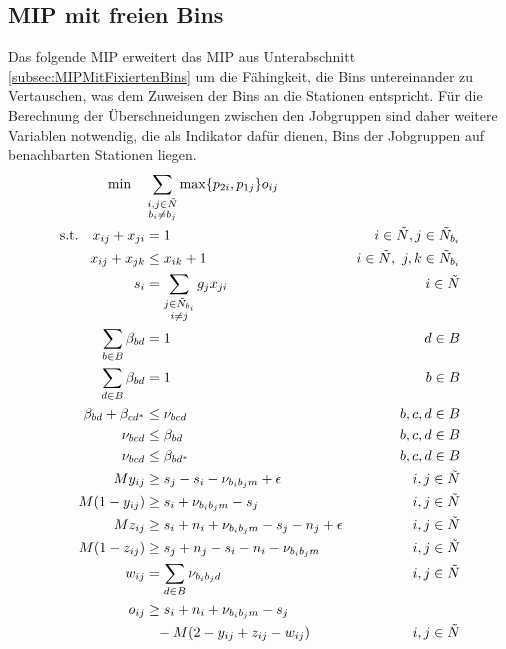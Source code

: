 \documentclass{scrreprt}
\begin{document}
\subsection{MIP mit freien Bins}
\label{subsec:MIPMitFreienBins}
Das folgende MIP erweitert das MIP aus Unterabschnitt \ref{subsec:MIPMitFixiertenBins} um die Fähingkeit, die Bins untereinander zu Vertauschen,
was dem Zuweisen der Bins an die Stationen entspricht.
Für die Berechnung der Überschneidungen zwischen den Jobgruppen sind daher weitere Variablen notwendig, die als Indikator dafür dienen,
Bins der Jobgruppen auf benachbarten Stationen liegen.
\begin{align}
    \text{min}\quad &\sum_{\substack{i,j\in\tilde{N}\\b_i\neq b_j}} 
            \max\{p_{2i},p_{1j}\}o_{ij} \label{objfunc}\\
    \text{s.t.} \quad x_{ij} + x_{ji} &= 1 &i\in\tilde{N}, j\in\tilde{N}_{b_i} 
            \label{con:reflex}\\
    x_{ij} + x_{jk} &\leq x_{ik} + 1 &i\in\tilde{N},\,\, j,k\in\tilde{N}_{b_i} 
            \label{con:transitiv} \\
    s_i &= \sum_{\substack{j\in\tilde{N}_{b_i}\\i\neq j}} g_j x_{ji} &i\in\tilde{N} 
            \label{con:start} \\
	\sum_{b\in B}\beta_{bd} &= 1 &d\in B \label{con:binpos} \\
	\sum_{d\in B}\beta_{bd} &= 1 &b\in B \label{con:binpos2} \\
	\beta_{bd} + \beta_{cd^*} &\leq \nu_{bcd} &b,c,d\in B \label{con:nu} \\
	\nu_{bcd} &\leq \beta_{bd} &b,c,d\in B \label{con:nurev} \\
    \nu_{bcd} &\leq \beta_{bd^*} &b,c,d\in B \label{con:nurev2} \\
    My_{ij} &\geq s_j - s_i - \nu_{b_ib_jm} + \epsilon &i,j\in\tilde{N} \\
    M(1-y_{ij}) &\geq s_i + \nu_{b_ib_jm} - s_j &i,j\in\tilde{N} \\
    Mz_{ij} &\geq s_i + n_i + \nu_{b_ib_jm} - s_j - n_j + \epsilon &i,j\in\tilde{N} \\
    M(1-z_{ij}) &\geq s_j + n_j - s_i - n_i - \nu_{b_ib_jm} &i,j\in\tilde{N} \\
	w_{ij} &= \sum_{d\in B} \nu_{b_ib_jd} &i,j\in\tilde{N} \label{con:w} \\
    o_{ij} &\geq s_i + n_i + \nu_{b_ib_jm} - s_j \notag \\
		   &\phantom{\geq} - M(2-y_{ij}+z_{ij}-w_{ij}) &i,j\in\tilde{N} \label{con:o1} \\

\end{align}
\end{document}
